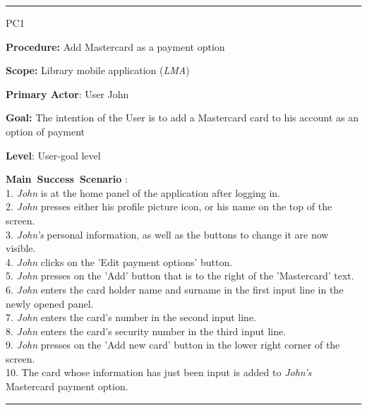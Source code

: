 \vspace{0.5cm}
\hrule
\begin{lyxlist}{PC1}
\small{
\item [\textbf{Procedure:}] Add Mastercard as a payment option
\item [\textbf{Scope:}] Library mobile application (\emph{LMA})
\item [\textbf{Primary Actor}:] User John
\item [\textbf{Goal:}] The intention of the User is to add a Mastercard card to
his account as an option of payment
\item [\textbf{Level}:] User-goal level
\item [\textbf{Main~Success~Scenario}]:\\
1. \emph{John} is at the home panel of the application after logging in.\\
2. \emph{John} presses either his profile picture icon, or his name on the
top of the screen.\\
3. \emph{John's} personal information, as well as the buttons to change it are
now visible.\\
4. \emph{John} clicks on the 'Edit payment options' button.\\
5. \emph{John} presses on the 'Add' button that is to the right of the
'Mastercard' text.\\
6. \emph{John} enters the card holder name and surname in the first input line
in the newly opened panel. \\
7. \emph{John} enters the card's number in the second input line. \\
8. \emph{John} enters the card's security number in the third input line. \\
9. \emph{John} presses on the 'Add new card' button in the lower right corner of
the screen. \\
10. The card whose information has just been input is added to
\emph{John's} Mastercard payment option. \\

}

\end{lyxlist}
\hrule



